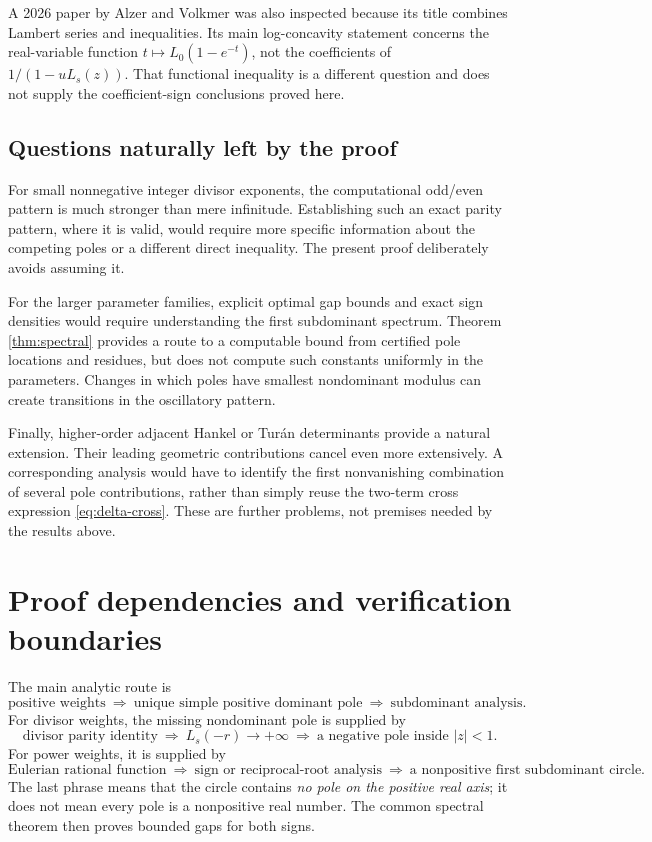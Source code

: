 \documentclass[11pt,letterpaper]{article}
\theoremstyle{definition}
\numberwithin{equation}{section}
\begin{document}
A 2026 paper by Alzer and Volkmer \cite{AV26} was also inspected because
its title combines Lambert series and inequalities. Its main
log-concavity statement concerns the real-variable function
$t\mapsto L_0(1-e^{-t})$, not the coefficients of $1/(1-uL_s(z))$.
That functional inequality is a different question and does not supply
the coefficient-sign conclusions proved here.

\subsection{Questions naturally left by the proof}

For small nonnegative integer divisor exponents, the computational
odd/even pattern is much stronger than mere infinitude. Establishing
such an exact parity pattern, where it is valid, would require more
specific information about the competing poles or a different direct
inequality. The present proof deliberately avoids assuming it.

For the larger parameter families, explicit optimal gap bounds and exact
sign densities would require understanding the first subdominant spectrum.
Theorem \ref{thm:spectral} provides a route to a computable bound from
certified pole locations and residues, but does not compute such constants
uniformly in the parameters. Changes in which poles have smallest
nondominant modulus can create transitions in the oscillatory pattern.

Finally, higher-order adjacent Hankel or Tur\'an determinants provide a
natural extension. Their leading geometric contributions cancel even
more extensively. A corresponding analysis would have to identify the
first nonvanishing combination of several pole contributions, rather
than simply reuse the two-term cross expression \eqref{eq:delta-cross}.
These are further problems, not premises needed by the results above.

\appendix
\section{Proof dependencies and verification boundaries}

The main analytic route is
\[
\text{positive weights}
\ \Longrightarrow\ \text{unique simple positive dominant pole}
\ \Longrightarrow\ \text{subdominant analysis}.
\]
For divisor weights, the missing nondominant pole is supplied by
\[
\text{divisor parity identity}
\ \Longrightarrow\ L_s(-r)\to+\infty
\ \Longrightarrow\ \text{a negative pole inside }|z|<1.
\]
For power weights, it is supplied by
\[
\text{Eulerian rational function}
\ \Longrightarrow\ \text{sign or reciprocal-root analysis}
\ \Longrightarrow\ \text{a nonpositive first subdominant circle}.
\]
The last phrase means that the circle contains \emph{no pole on the
positive real axis}; it does not mean every pole is a nonpositive real number.
The common spectral theorem then proves bounded gaps for both signs.
\end{document}
